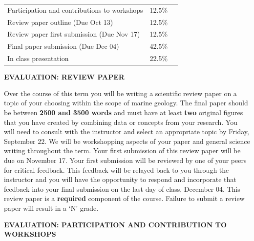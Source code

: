 \documentclass[11pt]{article}
\begin{document}
\begin{center}
	\begin{tabular}{ L{.68\linewidth}R{.1\linewidth} R{.33\linewidth} }
		Participation and contributions to workshops & 12.5\% \\
		Review paper outline (Due Oct 13)            & 12.5\% \\
		Review paper first submission (Due Nov 17)   & 12.5\% \\
		Final paper submission (Due Dec 04)          & 42.5\% \\
		In class presentation                        & 22.5\% \\
	\end{tabular}
\end{center}

\textbf{EVALUATION: REVIEW PAPER}

Over the course of this term you will be writing a scientific review paper on a topic of your choosing within the scope of marine geology. The final paper should be between \textbf{2500 and 3500 words} and must have at least \textbf{two} original figures that you have created by combining data or concepts from your research. You will need to consult with the instructor and select an appropriate topic by Friday, September 22. We will be workshopping aspects of your paper and general science writing throughout the term. Your first submission of this review paper will be due on November 17. Your first submission will be reviewed by one of your peers for critical feedback. This feedback will be relayed back to you through the instructor and you will have the opportunity to respond and incorporate that feedback into your final submission on the last day of class, December 04. This review paper is a \textbf{required} component of the course. Failure to submit a review paper will result in a `N' grade.

\textbf{EVALUATION: PARTICIPATION AND CONTRIBUTION TO WORKSHOPS}
\end{document}

